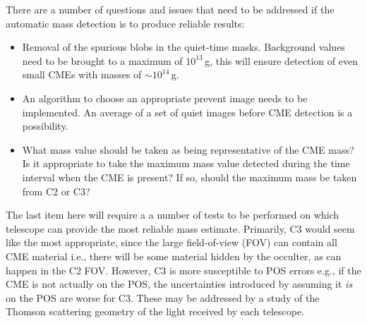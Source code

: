 There are a number of questions and issues that need to be addressed if the automatic mass detection is to produce reliable results:
\begin{itemize}
\item Removal of the spurious blobs in the quiet-time masks. Background values need to be brought to a maximum of $10^{13}$\,g, this will ensure detection of even small CMEs with masses of $\sim$$10^{14}$\,g.
\item An algorithm to choose an appropriate prevent image needs to be implemented. An average of a set of quiet images before CME detection is a possibility. 
\item What mass value should be taken as being representative of the CME mass? Is it appropriate to take the maximum mass value detected during the time interval when the CME is present? If so, should the maximum mass be taken from C2 or C3?
\end{itemize}
The last item here will require a a number of tests to be performed on which telescope can provide the most reliable mass estimate. Primarily, C3 would seem like the most appropriate, since the large field-of-view (FOV) can contain all CME material i.e., there will be some material hidden by the occulter, as can happen in the C2 FOV. However, C3 is more susceptible to POS errors e.g., if the CME is not actually on the POS, the uncertainties introduced by assuming it \emph{is} on the POS are worse for C3. 
These may be addressed by a study of the Thomson scattering geometry of the light received by each telescope.

